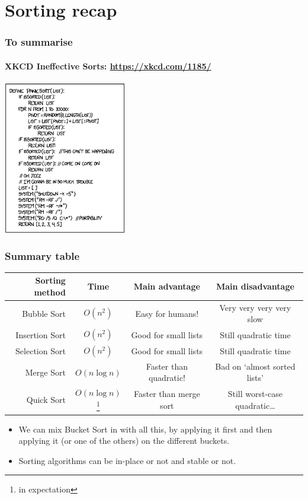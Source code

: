 \section{Sorting recap}
\label{sec:sorting_recap}

\begin{frame}
	\frametitle{To summarise}
	\framesubtitle{XKCD Ineffective Sorts: \url{https://xkcd.com/1185/}}
	\begin{center}
		\includegraphics[width=0.4\textwidth]{figures/panicsort.png}\\
	\end{center}
\end{frame}

\begin{frame}
	\frametitle{Summary table}
	\begin{tabular}{r | c | c | c}
		\small
		Sorting method & Time & Main advantage & Main disadvantage \\
		\midrule
		Bubble Sort & $O(n^2)$ & Easy for humans! &  Very very very very slow \\
		Insertion Sort & $O(n^2)$ & Good for small lists &  Still quadratic time \\
		Selection Sort & $O(n^2)$ & Good for small lists &  Still quadratic time \\
		Merge Sort & $O(n \log n)$ & Faster than quadratic! &  Bad on `almost sorted lists' \\
		Quick Sort & $O(n \log n)$\footnote{in expectation} & Faster than merge sort &  Still worst-case quadratic\dots \\
	\end{tabular}
	\begin{itemize}
		\item We can mix Bucket Sort in with all this, by applying it first and then applying it (or one of the others) on
			the different buckets.
		\item Sorting algorithms can be in-place or not and stable or not.
	\end{itemize}
\end{frame}

